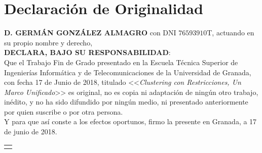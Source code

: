 \chapter*{Declaración de Originalidad}
\thispagestyle{empty}

\bigskip

\noindent \textbf{D. GERMÁN GONZÁLEZ ALMAGRO} con DNI $76593910$T, actuando en su propio nombre y derecho,\\

\noindent \textbf{DECLARA, BAJO SU RESPONSABILIDAD}:\\

\noindent Que el Trabajo Fin de Grado presentado en la Escuela Técnica Superior de Ingenierías Informática y de Telecomunicaciones de la Universidad de  Granada, con fecha 17 de Junio de 2018, titulado <<\textit{Clustering con Restricciones, Un Marco Unificado}>> es original, no es copia ni adaptación de ningún otro trabajo, inédito, y no ha sido difundido por ningún medio, ni presentado anteriormente por quien suscribe o por otra persona.\\



\noindent Y para que así conste a los efectos oportunos, firmo la presente en Granada, a 17 de junio de 2018.



\vspace{3cm}

\smallskip

\begin{flushright}
    \begin{tabular}{m{6cm}}
        \\ \hline
        \centering{Fdo. \myName} \\
    \end{tabular}
\end{flushright}
